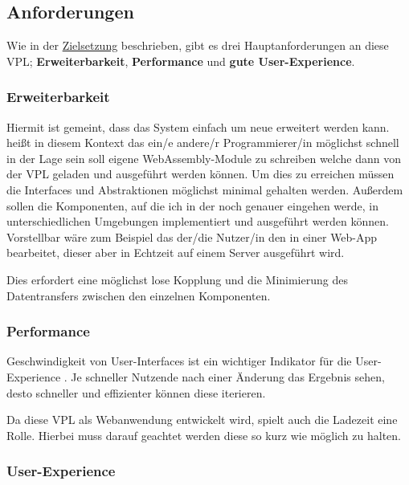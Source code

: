 \documentclass[ngerman]{article}
\begin{document}
\pagebreak

\subsection{Anforderungen}

Wie in der \hyperref[sec:Zielsetzung]{Zielsetzung} beschrieben, gibt es drei Hauptanforderungen an diese VPL; \textbf{Erweiterbarkeit}, \textbf{Performance} und \textbf{gute User-Experience}.

\subsubsection{Erweiterbarkeit}

Hiermit ist gemeint, dass das System einfach um neue  erweitert werden kann.
 heißt in diesem Kontext das ein/e andere/r Programmierer/in möglichst 
schnell in der Lage sein soll eigene WebAssembly-Module zu schreiben welche dann von der VPL geladen und ausgeführt werden können.
Um dies zu erreichen müssen die Interfaces und Abstraktionen möglichst minimal gehalten werden.
\br
Außerdem sollen die Komponenten, auf die ich in der  noch genauer eingehen werde, in unterschiedlichen Umgebungen implementiert und ausgeführt werden können.
Vorstellbar wäre zum Beispiel das der/die Nutzer/in den  in einer Web-App bearbeitet, dieser aber in Echtzeit auf einem Server ausgeführt wird.

Dies erfordert eine möglichst lose Kopplung und die Minimierung des Datentransfers zwischen den einzelnen Komponenten.

\subsubsection{Performance}

Geschwindigkeit von User-Interfaces ist ein wichtiger Indikator für die User-Experience \cite{6876022}. 
Je schneller Nutzende nach einer Änderung das Ergebnis sehen, desto schneller und effizienter können diese iterieren. 

Da diese VPL als Webanwendung entwickelt wird, spielt auch die Ladezeit eine Rolle. 
Hierbei muss darauf geachtet werden diese so kurz wie möglich zu halten.

\subsubsection{User-Experience}
\end{document}
